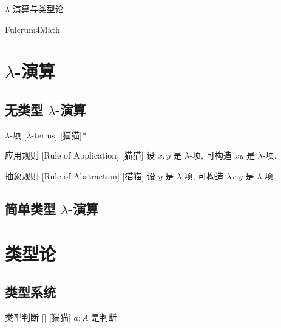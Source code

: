 \documentclass[UTF8]{ctexart}
\begin{document}
\begin{center}
    {\LARGE \(\lambda\)-演算与类型论}

    Fulcrum4Math
\end{center}

\tableofcontents
\newpage

\section{\(\lambda\)-演算}

    \subsection{无类型 \(\lambda\)-演算}
    
        \begin{dfn}
            {\(\lambda\)-项}
            [\(\lambda\)-terms]
            [猫猫]*
        \end{dfn}
        
        \begin{rul}
            {应用规则}
            [Rule of Application]
            [猫猫]
            设 \(x,y\) 是 \(\lambda\)-项, 可构造 \(xy\) 是 \(\lambda\)-项. 
        \end{rul}
        
        \begin{rul}
            {抽象规则}
            [Rule of Abstraction]
            [猫猫]
            设 \(y\) 是 \(\lambda\)-项, 可构造 \(\lambda x.y\) 是 \(\lambda\)-项. 
        \end{rul}

    \subsection{简单类型 \(\lambda\)-演算}

\section{类型论}

    \subsection{类型系统}
    
        \begin{dfn}
            []
            {类型判断}
            []
            [猫猫]
            \(a:A\) 是判断
        \end{dfn}
        
\end{document}
